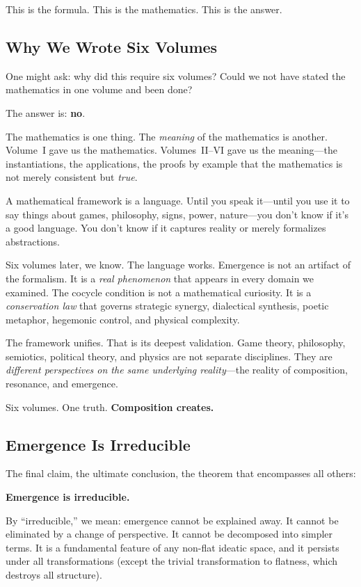 This is the formula. This is the mathematics. This is the answer.

\subsection{Why We Wrote Six Volumes}

One might ask: why did this require six volumes? Could we not have stated the
mathematics in one volume and been done?

The answer is: \textbf{no}.

The mathematics is one thing. The \emph{meaning} of the mathematics is another.
Volume~I gave us the mathematics. Volumes~II--VI gave us the meaning---the
instantiations, the applications, the proofs by example that the mathematics
is not merely consistent but \emph{true}.

A mathematical framework is a language. Until you speak it---until you use it
to say things about games, philosophy, signs, power, nature---you don't know
if it's a good language. You don't know if it captures reality or merely
formalizes abstractions.

Six volumes later, we know. The language works. Emergence is not an artifact
of the formalism. It is a \emph{real phenomenon} that appears in every domain
we examined. The cocycle condition is not a mathematical curiosity. It is a
\emph{conservation law} that governs strategic synergy, dialectical synthesis,
poetic metaphor, hegemonic control, and physical complexity.

The framework unifies. That is its deepest validation. Game theory, philosophy,
semiotics, political theory, and physics are not separate disciplines. They
are \emph{different perspectives on the same underlying reality}---the reality
of composition, resonance, and emergence.

Six volumes. One truth. \textbf{Composition creates.}

\subsection{Emergence Is Irreducible}

The final claim, the ultimate conclusion, the theorem that encompasses all
others:

\begin{center}
\Large\textbf{Emergence is irreducible.}
\end{center}

By ``irreducible,'' we mean: emergence cannot be explained away. It cannot be
eliminated by a change of perspective. It cannot be decomposed into simpler
terms. It is a fundamental feature of any non-flat ideatic space, and it
persists under all transformations (except the trivial transformation to flatness,
which destroys all structure).

